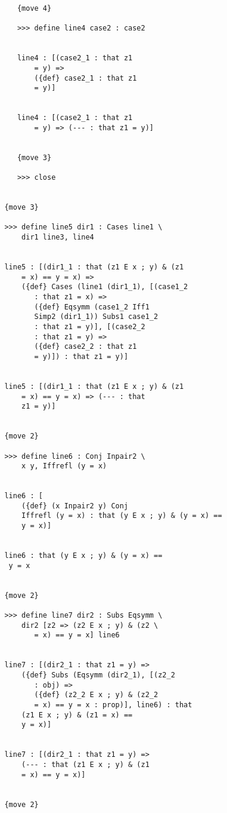\documentclass[12pt]{article}
\begin{document}
\begin{verbatim}
            {move 4}

            >>> define line4 case2 : case2


            line4 : [(case2_1 : that z1 
                = y) => 
                ({def} case2_1 : that z1 
                = y)]


            line4 : [(case2_1 : that z1 
                = y) => (--- : that z1 = y)]


            {move 3}

            >>> close


         {move 3}

         >>> define line5 dir1 : Cases line1 \
             dir1 line3, line4


         line5 : [(dir1_1 : that (z1 E x ; y) & (z1 
             = x) == y = x) => 
             ({def} Cases (line1 (dir1_1), [(case1_2 
                : that z1 = x) => 
                ({def} Eqsymm (case1_2 Iff1 
                Simp2 (dir1_1)) Subs1 case1_2 
                : that z1 = y)], [(case2_2 
                : that z1 = y) => 
                ({def} case2_2 : that z1 
                = y)]) : that z1 = y)]


         line5 : [(dir1_1 : that (z1 E x ; y) & (z1 
             = x) == y = x) => (--- : that 
             z1 = y)]


         {move 2}

         >>> define line6 : Conj Inpair2 \
             x y, Iffrefl (y = x)


         line6 : [
             ({def} (x Inpair2 y) Conj 
             Iffrefl (y = x) : that (y E x ; y) & (y = x) == 
             y = x)]


         line6 : that (y E x ; y) & (y = x) == 
          y = x


         {move 2}

         >>> define line7 dir2 : Subs Eqsymm \
             dir2 [z2 => (z2 E x ; y) & (z2 \
                = x) == y = x] line6


         line7 : [(dir2_1 : that z1 = y) => 
             ({def} Subs (Eqsymm (dir2_1), [(z2_2 
                : obj) => 
                ({def} (z2_2 E x ; y) & (z2_2 
                = x) == y = x : prop)], line6) : that 
             (z1 E x ; y) & (z1 = x) == 
             y = x)]


         line7 : [(dir2_1 : that z1 = y) => 
             (--- : that (z1 E x ; y) & (z1 
             = x) == y = x)]


         {move 2}


\end{verbatim}
\end{document}
